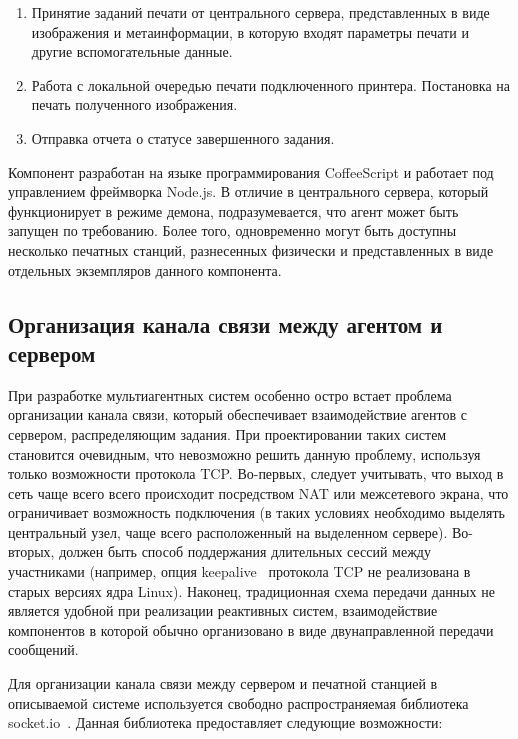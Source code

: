 \documentclass[a4paper,14pt,href,draft]{article}
\begin{document}
\begin{enumerate}
  \item Принятие заданий печати от центрального сервера, представленных в виде изображения и метаинформации, в которую
  входят параметры печати и другие вспомогательные данные.

  \item Работа с локальной очередью печати подключенного принтера. Постановка на печать полученного изображения.

  \item Отправка отчета о статусе завершенного задания.
\end{enumerate}

Компонент разработан на языке программирования CoffeeScript и работает под управлением фреймворка Node.js. В отличие в
центрального сервера, который функционирует в режиме демона, подразумевается, что агент может быть запущен по требованию.
Более того, одновременно могут быть доступны несколько печатных станций, разнесенных физически и представленных в виде
отдельных экземпляров данного компонента.

\subsection{Организация канала связи между аген\-том и сервером}
При разработке мультиагентных систем особенно остро встает проблема организации канала связи, который обеспечивает
взаимодействие агентов с сервером, распределяющим задания. При проектировании таких систем становится очевидным, что
невозможно решить данную проблему, используя только возможности протокола TCP. Во-первых, следует учитывать, что
выход в сеть чаще всего всего происходит посредством NAT или межсетевого экрана, что ограничивает возможность
подключения (в таких условиях необходимо выделять центральный узел, чаще всего расположенный на выделенном сервере).
Во-вторых, должен быть способ поддержания длительных сессий между участниками (например, опция keepalive~\cite{Keepalive}
протокола TCP не реализована в старых версиях ядра Linux). Наконец, традиционная схема передачи данных не является
удобной при реализации реактивных систем, взаимодействие компонентов в которой обычно организовано в виде двунаправленной
передачи сообщений.

Для организации канала связи между сервером и печатной станцией в описываемой системе используется
свободно распространяемая библиотека socket.io~\cite{SocketIO}. Данная библиотека предоставляет следующие возможности:
\end{document}
